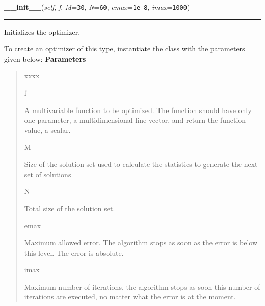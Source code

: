 \hspace{.8\funcindent}\begin{boxedminipage}{\funcwidth}

    \raggedright \textbf{\_\_init\_\_}(\textit{self}, \textit{f}, \textit{M}={\tt 30}, \textit{N}={\tt 60}, \textit{emax}={\tt 1e-8}, \textit{imax}={\tt 1000})

    \vspace{-1.5ex}

    \rule{\textwidth}{0.5\fboxrule}
\setlength{\parskip}{2ex}

Initializes the optimizer.

To create an optimizer of this type, instantiate the class with the
parameters given below:
\setlength{\parskip}{1ex}
      \textbf{Parameters}
      \vspace{-1ex}

      \begin{quote}
        \begin{Ventry}{xxxx}

          \item[f]


A multivariable function to be optimized. The function should have
only one parameter, a multidimensional line-vector, and return the
function value, a scalar.
          \item[M]


Size of the solution set used to calculate the statistics to
generate the next set of solutions
          \item[N]


Total size of the solution set.
          \item[emax]


Maximum allowed error. The algorithm stops as soon as the error is
below this level. The error is absolute.
          \item[imax]


Maximum number of iterations, the algorithm stops as soon this
number of iterations are executed, no matter what the error is at
the moment.
        \end{Ventry}

      \end{quote}

    \end{boxedminipage}

    \label{peach:optm:stochastic:CrossEntropy:step}


